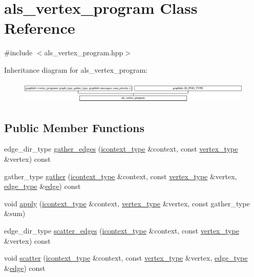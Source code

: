 \hypertarget{classals__vertex__program}{\section{als\-\_\-vertex\-\_\-program Class Reference}
\label{classals__vertex__program}
}


{\ttfamily \#include $<$als\-\_\-vertex\-\_\-program.\-hpp$>$}

Inheritance diagram for als\-\_\-vertex\-\_\-program\-:\begin{figure}[H]
\begin{center}
\leavevmode
\includegraphics[height=1.062619cm]{classals__vertex__program}
\end{center}
\end{figure}
\subsection*{Public Member Functions}
\begin{DoxyCompactItemize}
\item 
edge\-\_\-dir\-\_\-type \hyperlink{classals__vertex__program_aa70153f16b28263ed6112d012d7a3e86}{gather\-\_\-edges} (\hyperlink{classgraphlab_1_1icontext}{icontext\-\_\-type} \&context, const \hyperlink{structgraphlab_1_1_graph_lab_vertex_wrapper}{vertex\-\_\-type} \&vertex) const 
\item 
gather\-\_\-type \hyperlink{classals__vertex__program_ab6263c7cdde54dea2c1cd50b4c732169}{gather} (\hyperlink{classgraphlab_1_1icontext}{icontext\-\_\-type} \&context, const \hyperlink{structgraphlab_1_1_graph_lab_vertex_wrapper}{vertex\-\_\-type} \&vertex, \hyperlink{structgraphlab_1_1_graph_lab_edge_wrapper}{edge\-\_\-type} \&\hyperlink{structedge}{edge}) const 
\item 
void \hyperlink{classals__vertex__program_a38b2ce9db8057202495be03324bba2b5}{apply} (\hyperlink{classgraphlab_1_1icontext}{icontext\-\_\-type} \&context, \hyperlink{structgraphlab_1_1_graph_lab_vertex_wrapper}{vertex\-\_\-type} \&vertex, const gather\-\_\-type \&sum)
\item 
edge\-\_\-dir\-\_\-type \hyperlink{classals__vertex__program_a6854f1ddb0f0bccc3c8e48711320f645}{scatter\-\_\-edges} (\hyperlink{classgraphlab_1_1icontext}{icontext\-\_\-type} \&context, const \hyperlink{structgraphlab_1_1_graph_lab_vertex_wrapper}{vertex\-\_\-type} \&vertex) const 
\item 
void \hyperlink{classals__vertex__program_a72eb6fbad2a390df75a023cdf8bbc5fd}{scatter} (\hyperlink{classgraphlab_1_1icontext}{icontext\-\_\-type} \&context, const \hyperlink{structgraphlab_1_1_graph_lab_vertex_wrapper}{vertex\-\_\-type} \&vertex, \hyperlink{structgraphlab_1_1_graph_lab_edge_wrapper}{edge\-\_\-type} \&\hyperlink{structedge}{edge}) const 
\end{DoxyCompactItemize}

